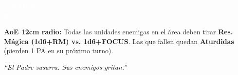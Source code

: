 \begin{center}
\begin{tcbitemize}
    \vfill

    \noindent
    \begin{minipage}[b]{0.22\linewidth}
        \begin{tcolorbox}[colback=BloodPurple, colframe=VoidBlack, sharp corners,
                          halign=center, valign=center, boxsep=0pt,
                          left=0pt, right=0pt, top=0pt, bottom=0pt,
                          nobeforeafter, height=1.9cm]
            \textcolor{white}{\fontsize{5.5}{6}\selectfont COSTO PE\\[3pt] \Large \textbf{2}}
        \end{tcolorbox}
    \end{minipage}%
    \hfill
    \begin{minipage}[b]{0.75\linewidth}
        \begin{tcolorbox}[colback=white, colframe=VoidPurple, sharp corners, boxrule=0.5pt,
                          left=2pt, right=2pt, top=2pt, bottom=2pt,
                          nobeforeafter, height=1.4cm]
            \fontsize{6}{7}\selectfont
            \textbf{AoE 12cm radio:} Todas las unidades enemigas en el área deben tirar \textbf{Res. Mágica (1d6+RM) vs. 1d6+FOCUS}. Las que fallen quedan \textbf{Aturdidas} (pierden 1 PA en su próximo turno).
        \end{tcolorbox}
        \vspace{2pt}
        \begin{center}
            \fontsize{5.5}{6}\selectfont \itshape
            \textcolor{VoidPurple}{``El Padre susurra. Sus enemigos gritan.''}
        \end{center}
    \end{minipage}

\end{tcbitemize}
\end{center}

\newpage


